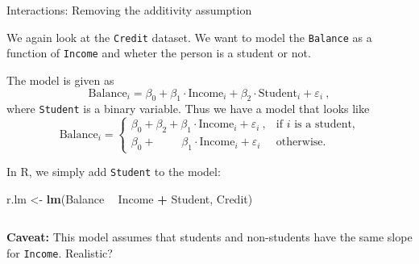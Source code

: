 \documentclass[10pt,ignorenonframetext,]{beamer}
\newenvironment{Shaded}{\begin{snugshade}}{\end{snugshade}}
\newcommand{\KeywordTok}[1]{\textcolor[rgb]{0.13,0.29,0.53}{\textbf{#1}}}
\newcommand{\NormalTok}[1]{#1}
\newcommand{\OperatorTok}[1]{\textcolor[rgb]{0.81,0.36,0.00}{\textbf{#1}}}
\newcommand{\StringTok}[1]{\textcolor[rgb]{0.31,0.60,0.02}{#1}}
\begin{document}
\begin{frame}[fragile]

\begin{block}{Interactions: Removing the additivity assumption}

\vspace{2mm}

We again look at the \texttt{Credit} dataset. We want to model the
\texttt{Balance} as a function of \texttt{Income} and wheter the person
is a student or not.

\vspace{2mm}

The model is given as
\[\text{Balance}_i = \beta_0 + \beta_1 \cdot \text{Income}_i + \beta_2 \cdot \text{Student}_i + \varepsilon_i \ ,\]
where \texttt{Student} is a binary variable. Thus we have a model that
looks like \begin{equation*}
\text{Balance}_i = \left\{ 
\begin{array}{ll}
\beta_0 + \beta_2 + \beta_1 \cdot \text{Income}_i  + \varepsilon_i \ ,  & \text{if $i$ is a student,}\\
\beta_0 + \qquad \; \beta_1 \cdot \text{Income}_i  + \varepsilon_i  & \text{otherwise.}
\end{array}
\right.
\end{equation*}

\vspace{2mm}

In R, we simply add \texttt{Student} to the model:

\vspace{2mm}

\scriptsize

\begin{Shaded}
\begin{Highlighting}[]
\NormalTok{r.lm <-}\StringTok{ }\KeywordTok{lm}\NormalTok{(Balance }\OperatorTok{~}\StringTok{ }\NormalTok{Income }\OperatorTok{+}\StringTok{ }\NormalTok{Student, Credit)}
\end{Highlighting}
\end{Shaded}

\(~\)

\normalsize

\textbf{Caveat:} This model assumes that students and non-students have
the same slope for \texttt{Income}. Realistic?

\end{block}

\end{frame}
\end{document}
